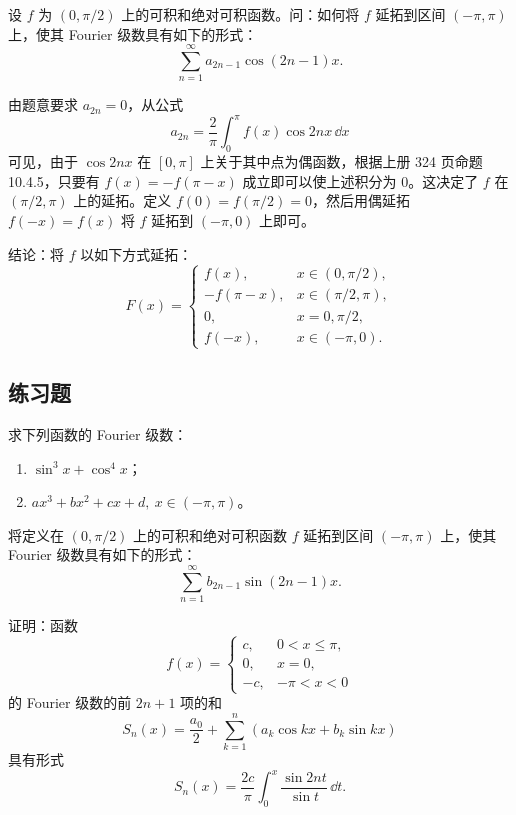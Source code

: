 \begin{xexample}[15.1.3]
设 $f$ 为 $(0,\pi/2)$ 上的可积和绝对可积函数。问：如何将 $f$ 延拓到区间 $(-\pi,\pi)$ 上，使其 Fourier 级数具有如下的形式：
\[
  \sum_{n=1}^{\infty}a_{2n-1}\cos(2n-1)x.
\]
\end{xexample}
\begin{xsolution}
由题意要求 $a_{2n}=0$，从公式
\[
  a_{2n}=\frac2\pi\int_0^{\pi}f(x)\cos2nx\,\dd x
\]
可见，由于 $\cos2nx$ 在 $[0,\pi]$ 上关于其中点为偶函数，根据上册 324 页命题 10.4.5，只要有 $f(x)=-f(\pi-x)$ 成立即可以使上述积分为 0。这决定了 $f$ 在 $(\pi/2,\pi)$ 上的延拓。定义 $f(0)=f(\pi/2)=0$，然后用偶延拓 $f(-x)=f(x)$ 将 $f$ 延拓到 $(-\pi,0)$ 上即可。

结论：将 $f$ 以如下方式延拓：
\[
  F(x)=
  \begin{cases}
    f(x),&x\in(0,\pi/2),\\
    -f(\pi-x),&x\in(\pi/2,\pi),\\
    0,&x=0,\pi/2,\\
    f(-x),&x\in(-\pi,0).
  \end{cases}
\]
\end{xsolution}

\subsection{练习题}

\begin{xexercise}[1]
求下列函数的 Fourier 级数：
  \begin{enumerate}[label=(\arabic*)]
    \item $\sin^3x+\cos^4x$；
    \item $ax^3+bx^2+cx+d,\ x\in(-\pi,\pi)$。
  \end{enumerate}
\end{xexercise}

\begin{xexercise}[2]
将定义在 $(0,\pi/2)$ 上的可积和绝对可积函数 $f$ 延拓到区间 $(-\pi,\pi)$ 上，使其 Fourier 级数具有如下的形式：
  \[
    \sum_{n=1}^{\infty}b_{2n-1}\sin(2n-1)x.
  \]
\end{xexercise}

\begin{xexercise}[3]
证明：函数
  \[
    f(x)=\begin{cases}
      c,&0<x\le\pi,\\
      0,&x=0,\\
      -c,&-\pi<x<0
    \end{cases}
  \]
  的 Fourier 级数的前 $2n+1$ 项的和
  \[
    S_n(x)=\frac{a_0}{2}+\sum_{k=1}^{n}(a_k\cos kx+b_k\sin kx)
  \]
  具有形式
  \[
    S_n(x)=\frac{2c}{\pi}\int_0^x\frac{\sin2nt}{\sin t}\,\dd t.
  \]
\end{xexercise}

